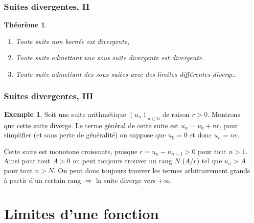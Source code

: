 \documentclass[10pt,notheorems]{beamer}
\theoremstyle{plain}
\newtheorem{theorem}{Théorème}
\theoremstyle{definition} %
\newtheorem{example}{Exemple}
\begin{document}
\begin{frame}
  \frametitle{Suites divergentes, II}

  \begin{theorem}

    \begin{enumerate}

    \item Toute suite non bornée est divergente,\newline

    \item Toute suite admettant une sous suite divergente est divergente.\newline

    \item Toute suite admettant des sous suites avec des limites différentes diverge.\newline

    \end{enumerate}

  \end{theorem}

\end{frame}


\begin{frame}
  \frametitle{Suites divergentes, III}

  \begin{example}

    Soit une suite arithmétique $(u_n)_{n\in\mathbb N}$ de raison
    $r>0$. Montrons que cette suite diverge. Le terme général de cette
    suite est $u_n = u_0+nr$, pour simplifier (et sans perte de
    généralité) on suppose que $u_0=0$ et donc $u_n=nr$.\newline

    Cette suite est monotone croissante, puisque $r=u_n-u_{n-1}>0$
    pour tout $n>1$. Ainsi pour tout $A>0$ on peut toujours trouver un
    rang $N$ ($A/r$) tel que $u_n>A$ pour tout $n>N$. On peut donc
    toujours trouver les termes arbitrairement grands à partir d'un
    certain rang $\Rightarrow$ la suite diverge vers $+\infty$.

  \end{example}

\end{frame}


\section{Limites d'une fonction}
\end{document}
